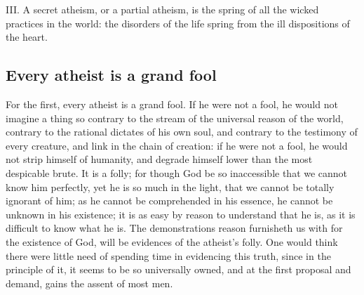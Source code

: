 \documentclass[a5paper]{book}
\begin{document}
III. A secret atheism, or a partial atheism, 
    is the spring of all the wicked practices in the world: 
    the disorders of the life spring from the ill dispositions of the heart.

\subsection{Every atheist is a grand fool}
For the first, every atheist is a grand fool. 
If he were not a fool, he would not imagine a thing so contrary 
    to the stream of the universal reason of the world, 
    contrary to the rational dictates of his own soul, 
    and contrary to the testimony of every creature, 
    and link in the chain of creation: 
    if he were not a fool, he would not strip himself of humanity, 
    and degrade himself lower than the most despicable brute. 
It is a folly; for though God be so inaccessible 
    that we cannot know him perfectly, 
    yet he is so much in the light, 
    that we cannot be totally ignorant of him; 
    as he cannot be comprehended in his essence, 
    he cannot be unknown in his existence; 
    it is as easy by reason to understand that he is, 
    as it is difficult to know what he is. 
The demonstrations reason furnisheth us with for the existence of God, 
    will be evidences of the atheist’s folly. 
One would think there were little need of spending time 
    in evidencing this truth, since in the principle of it, 
    it seems to be so universally owned, 
    and at the first proposal and demand, 
    gains the assent of most men.
\end{document}
